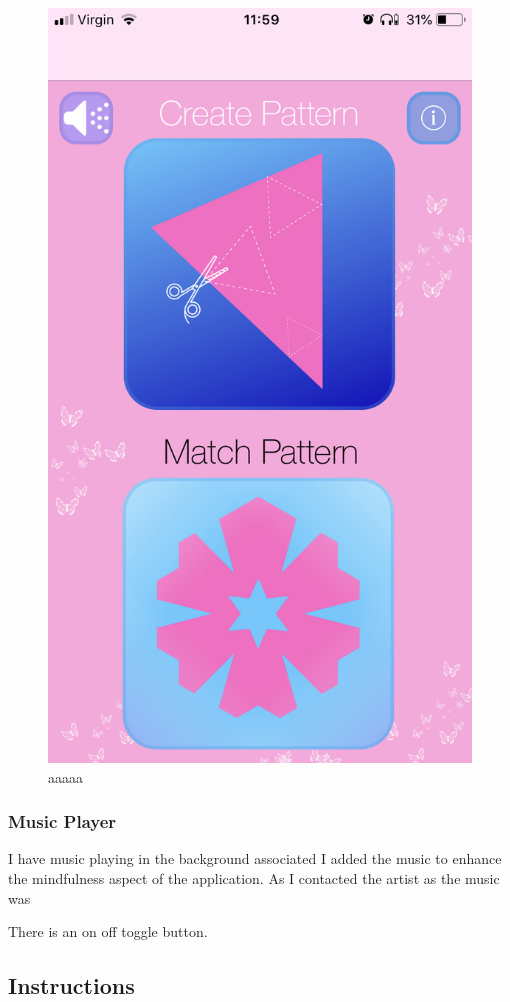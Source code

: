 \documentclass[11pt]{article}
\begin{document}
\begin{figure}[!ht]
\begin{minipage}{0.45\textwidth}
                            \includegraphics[width=0.7\linewidth]{KiriZen/main.png}
                            \caption{aaaaa}
                            \label{fig:kiriZen-main}
                        \end{minipage}
                    \end{figure}
            
             \subsubsection{Music Player}
                I have music playing in the background associated
                I added the music to enhance the mindfulness aspect of the application. As  I contacted the artist as the music was
                
                There is an on off toggle button. 
                
        \subsection{Instructions}
            
\end{document}
